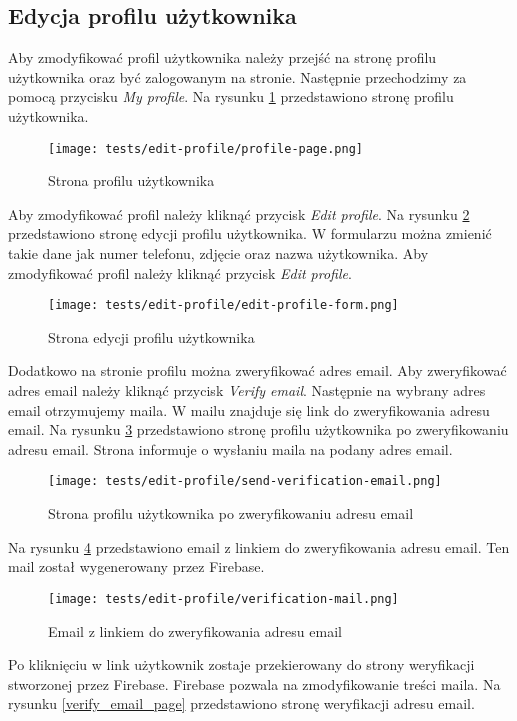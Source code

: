 \subsection{Edycja profilu użytkownika}
Aby zmodyfikować profil użytkownika należy przejść na stronę profilu użytkownika oraz być zalogowanym na stronie. Następnie przechodzimy za pomocą przycisku \textit{My profile}. Na rysunku \ref{profile_page} przedstawiono stronę profilu użytkownika.
\begin{figure}[H]
  \centering
  \texttt{[image: tests/edit-profile/profile-page.png]}
  \caption{Strona profilu użytkownika}
  \label{profile_page}
\end{figure}
Aby zmodyfikować profil należy kliknąć przycisk \textit{Edit profile}. Na rysunku \ref{edit_profile} przedstawiono stronę edycji profilu użytkownika. W formularzu można zmienić takie dane jak numer telefonu, zdjęcie oraz nazwa użytkownika. Aby zmodyfikować profil należy kliknąć przycisk \textit{Edit profile}.
\begin{figure}[H]
  \centering
  \texttt{[image: tests/edit-profile/edit-profile-form.png]}
  \caption{Strona edycji profilu użytkownika}
  \label{edit_profile}
\end{figure}
Dodatkowo na stronie profilu można zweryfikować adres email. Aby zweryfikować adres email należy kliknąć przycisk \textit{Verify email}. Następnie na wybrany adres email otrzymujemy maila. W mailu znajduje się link do zweryfikowania adresu email.  Na rysunku \ref{verify_email} przedstawiono stronę profilu użytkownika po zweryfikowaniu adresu email. Strona informuje o wysłaniu maila na podany adres email.
\begin{figure}[H]
  \centering
  \texttt{[image: tests/edit-profile/send-verification-email.png]}
  \caption{Strona profilu użytkownika po zweryfikowaniu adresu email}
  \label{verify_email}
\end{figure}
Na rysunku \ref{verify_email_message} przedstawiono email z linkiem do zweryfikowania adresu email. Ten mail został wygenerowany przez Firebase. 
\begin{figure}[H]
  \centering
  \texttt{[image: tests/edit-profile/verification-mail.png]}
  \caption{Email z linkiem do zweryfikowania adresu email}
  \label{verify_email_message}
\end{figure}
Po kliknięciu w link użytkownik zostaje przekierowany do strony weryfikacji stworzonej przez Firebase. Firebase pozwala na zmodyfikowanie treści maila. Na rysunku \ref{verify_email_page} przedstawiono stronę weryfikacji adresu email.
